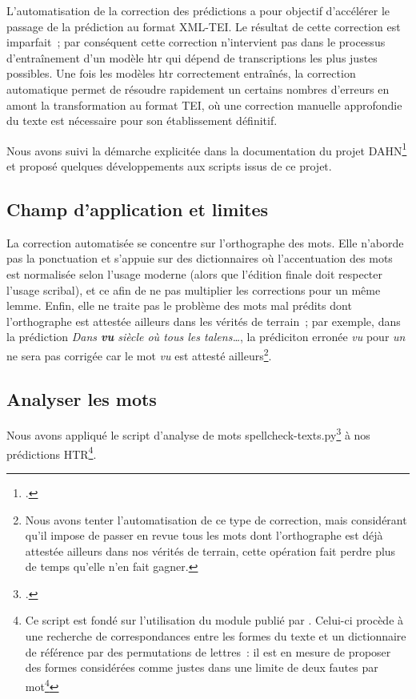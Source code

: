 \documentclass[a4paper,12pt,twoside]{book}
\begin{document}
			L'automatisation de la correction des prédictions a pour objectif d'accélérer le passage de la prédiction au format XML-TEI. Le résultat de cette correction est imparfait~; par conséquent cette correction n'intervient pas dans le processus d'entraînement d'un modèle \gls{htr} qui dépend de transcriptions les plus justes possibles. Une fois les modèles \gls{htr} correctement entraînés, la correction automatique permet de résoudre rapidement un certains nombres d'erreurs en amont la transformation au format TEI, où une correction manuelle approfondie du texte est nécessaire pour son établissement définitif.
			
			Nous avons suivi la démarche explicitée dans la documentation du projet DAHN\footcite{chiffoleauHowPostOCRCorrection2022} et proposé quelques développements aux scripts issus de ce projet.
			
			\subsection{Champ d'application et limites}	
				La correction automatisée se concentre sur l'orthographe des mots. Elle n'aborde pas la ponctuation et s'appuie sur des dictionnaires où l'accentuation des mots est normalisée selon l'usage moderne (alors que l'édition finale doit respecter l'usage scribal), et ce afin de ne pas multiplier les corrections pour un même lemme. Enfin, elle ne traite pas le problème des mots mal prédits dont l'orthographe est attestée ailleurs dans les vérités de terrain~; par exemple, dans la prédiction \textit{Dans \textbf{vu} siècle où tous les talens…}, la prédiciton erronée \textit{vu} pour \textit{un} ne sera pas corrigée car le mot \textit{vu} est attesté ailleurs\footnote{Nous avons tenter l'automatisation de ce type de correction, mais considérant qu'il impose de passer en revue tous les mots dont l'orthographe est déjà attestée ailleurs dans nos vérités de terrain, cette opération fait perdre plus de temps qu'elle n'en fait gagner.}.
					
			\subsection{Analyser les mots}
				Nous avons appliqué le script d'analyse de mots \textsf{spellcheck-texts.py}\footcite{biaySpellcheckTextsPy2022} à nos prédictions HTR\footnote{Ce script est fondé sur l'utilisation du module publié par  \cite{barrusPyspellcheckerPurePython}. Celui-ci procède à une recherche de correspondances entre les formes du texte et un dictionnaire de référence par des permutations de lettres~: il est en mesure de proposer des formes considérées comme justes dans une limite de deux fautes par mot\footnote{Par exemple, il reconnaît que la meilleure proposition pour le mot \textit{deusx} est \textit{deux}, mais n'est pas capable d'associer la forme \textit{pubièes} aux mots de la famille de \textit{publier}}}.
						
\end{document}
